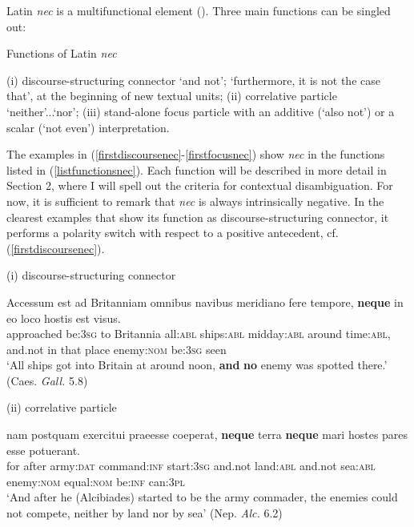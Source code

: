 \documentclass[output=paper,modfonts,nonflat,citecolor=brown,
showindex
]{langsci/langscibook}
\begin{document}
Latin {\emph{nec}} is a multifunctional element (\citealt[]{Orlandini01, OrlandiniPoccetti07}). Three main functions can be singled out: 

{\begin{exe}
\ex \label{listfunctionsnec} Functions of Latin {\emph{nec}}
\begin{xlist}
\ex (i) discourse-structuring connector `and not'; `furthermore, it is not the case that', at the beginning of new textual units;
\ex (ii) correlative particle `neither'...`nor';
\ex (iii) stand-alone focus particle with an additive (`also not') or a scalar (`not even') interpretation. 
\end{xlist}
\end{exe}}

\noindent The examples in (\ref{firstdiscoursenec}-\ref{firstfocusnec}) show {\emph{nec}} in the functions listed in (\ref{listfunctionsnec}). Each function will be described in more detail in Section 2, where I will spell out the criteria for contextual disambiguation. For now, it is sufficient to remark that {\emph{nec}} is always intrinsically negative. In the clearest examples that show its function as discourse-structuring connector, it performs a polarity switch with respect to a positive antecedent, cf. (\ref{firstdiscoursenec}).

{\begin{exe}
\ex (i) discourse-structuring connector 

\label{firstdiscoursenec} \gll Accessum est ad Britanniam omnibus navibus meridiano fere tempore, {\textbf{neque}} in eo loco hostis est visus.\\
approached be:{\textsc{3sg}} to Britannia all:{\textsc{abl}} ships:{\textsc{abl}} midday:{\textsc{abl}} around time:{\textsc{abl}}, and.not in that place enemy:{\textsc{nom}} be:{\textsc{3sg}} seen\\

`All ships got into Britain at around noon, {\textbf{and}} {\textbf{no}} enemy was spotted there.' (Caes.{\emph{ Gall.}} 5.8)

\end{exe}}

{\begin{exe}
\ex (ii) correlative particle 

\label{firstcorrelativenec} \gll nam postquam exercitui praeesse coeperat, {\textbf{neque}} terra {\textbf{neque}} mari hostes pares esse potuerant.\\
for after army:{\textsc{dat}} command:{\textsc{inf}} start:{\textsc{3sg}} and.not land:{\textsc{abl}} and.not sea:{\textsc{abl}} enemy:{\textsc{nom}} equal:{\textsc{nom}} be:{\textsc{inf}} can:{\textsc{3pl}}\\

`And after he (Alcibiades) started to be the army commader, the enemies could not compete, neither by land nor by sea'
(Nep. {\emph{Alc.}} 6.2)
\end{exe}}
\end{document}
